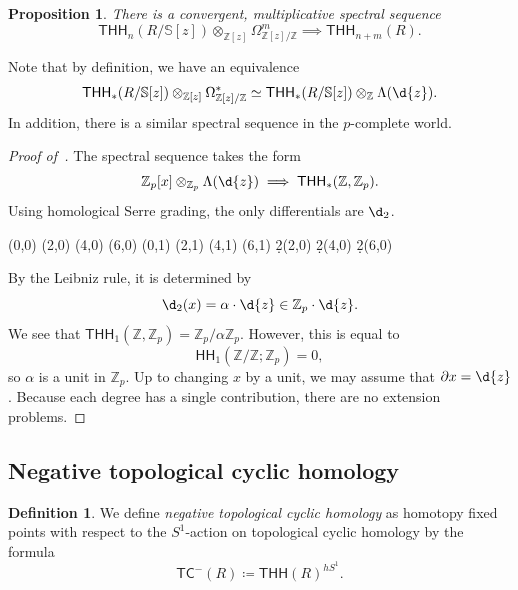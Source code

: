 \documentclass[10pt, oneside]{memoir}
\newtheorem{prop}[thm]{Proposition}
\theoremstyle{definition}
\newtheorem{defn}[thm]{Definition}
\theoremstyle{remark}
\theoremstyle{plain}
\theoremstyle{definition}
\theoremstyle{remark}
\newcommand{\Z}{\mathbb{Z}}
\newcommand{\bS}{\mathbb{S}}
\newcommand{\ms}[1]{\mathsf{#1}}
\newcommand{\1}{\mathbf{1}}
\newcommand{\2}{\mathbf{2}}
\newcommand{\3}{\mathbf{3}}
\newcommand{\THH}{\ms{THH}}
\newcommand{\TC}{\ms{TC}}
\newcommand{\HH}{\ms{HH}}
\begin{document}
\begin{prop}
    There is a convergent, multiplicative spectral sequence
    \[ \THH_n(R/\bS[z]) \otimes_{\Z[z]} \Omega^m_{\Z[z]/\Z} \implies \THH_{n+m}(R). \]
\end{prop}

Note that by definition, we have an equivalence
\[ \THH_*(R / \bS[z]) \otimes_{\Z[z]} \Omega^*_{\Z[z]/\Z} \simeq \THH_*(R/\bS[z]) \otimes_{\Z} \Lambda(\d{z}). \]
In addition, there is a similar spectral sequence in the \(p \)-complete world.

\begin{proof}[Proof of~]
    The spectral sequence takes the form
    \[ \Z_p[x] \otimes_{\Z_p} \Lambda(\d{z}) \implies \THH_*(\Z, \Z_p). \]
    Using homological Serre grading, the only differentials are \(\d_2 \).
    \begin{center}
        \begin{sseqdata}[classes={draw=none}, name=thhz, homological Serre
            grading, xscale=1, y axis gap = 2em, axes type = frame] 
            \class["1"](0,0) 
            \class["x"](2,0)
            \class["x^2"](4,0)
            \class["x^3"](6,0)
            \class["dz"](0,1)
            \class["x \cdot dz"](2,1)
            \class["x^2 \cdot dz"](4,1)
            \class["x^3 \cdot dz"](6,1)
            \d2(2,0)
            \d2(4,0)
            \d2(6,0)
        \end{sseqdata} 
        \printpage[name=thhz, page=2] 
    \end{center}
    By the Leibniz rule, it is determined by
    \[ \d_2(x) = \alpha \cdot \d{z} \in \Z_p \cdot \d{z}. \]
    We see that \(\THH_1(\Z, \Z_p) = \Z_p / \alpha \Z_p \). However, this is equal to
    \[ \HH_1(\Z/\Z; \Z_p) = 0, \]
    so \(\alpha \) is a unit in \(\Z_p \). Up to changing \(x \) by a unit, we may assume that \(\partial x = \d{z} \). Because each degree has a single contribution, there are no extension problems.
\end{proof}


\subsection{Negative topological cyclic homology}%
\label{sub:Negative topological cyclic homology}

\begin{defn}
    We define \textit{negative topological cyclic homology} as homotopy fixed points with respect to the \(S^1 \)-action on topological cyclic homology by the formula
    \[ \TC^-(R) \coloneqq \THH(R)^{h S^1}. \]
\end{defn}
\end{document}
